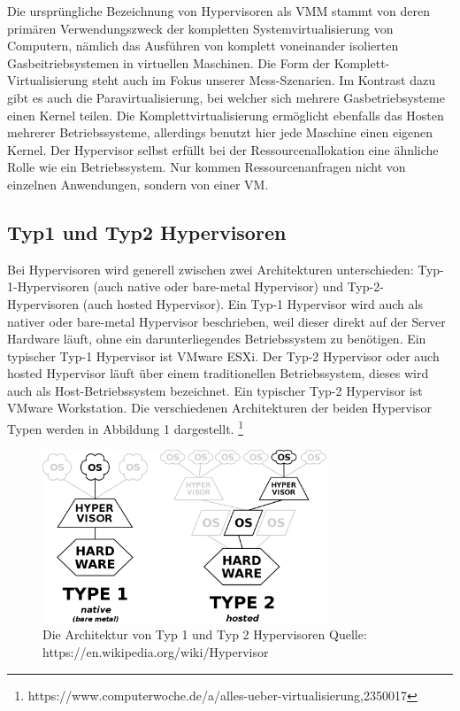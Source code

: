 \documentclass[conference]{IEEEtran}
\newcommand{\citep}{\cite}
\begin{document}
Die ursprüngliche Bezeichnung von Hypervisoren als VMM stammt von deren primären Verwendungszweck der kompletten Systemvirtualisierung von Computern, nämlich das Ausführen von komplett voneinander isolierten Gasbeitriebsystemen in virtuellen Maschinen. Die Form der Komplett-Virtualisierung steht auch im Fokus unserer Mess-Szenarien. Im Kontrast dazu gibt es auch die Paravirtualisierung, bei welcher sich mehrere Gasbetriebsysteme einen Kernel teilen. Die Komplettvirtualisierung ermöglicht ebenfalls das Hosten mehrerer Betriebssysteme, allerdings benutzt hier jede Maschine einen eigenen Kernel. Der Hypervisor selbst erfüllt bei der Ressourcenallokation eine ähnliche Rolle wie ein Betriebssystem. Nur kommen Ressourcenanfragen nicht von einzelnen Anwendungen, sondern von einer VM. \citep{Goldberg1973}

\subsection{Typ1 und Typ2 Hypervisoren}
Bei Hypervisoren wird generell zwischen zwei Architekturen unterschieden: Typ-1-Hypervisoren (auch native oder bare-metal Hypervisor) und Typ-2-Hypervisoren (auch hosted Hypervisor). Ein Typ-1 Hypervisor wird auch als nativer oder bare-metal Hypervisor beschrieben, weil dieser direkt auf der Server Hardware läuft, ohne ein darunterliegendes Betriebssystem zu benötigen. Ein typischer Typ-1 Hypervisor ist VMware ESXi. Der Typ-2 Hypervisor oder auch hosted Hypervisor läuft über einem traditionellen Betriebssystem, dieses wird auch als Host-Betriebssystem bezeichnet. Ein typischer Typ-2 Hypervisor ist VMware Workstation. Die verschiedenen Architekturen der beiden Hypervisor Typen werden in Abbildung 1 dargestellt. \footnote{https://www.computerwoche.de/a/alles-ueber-virtualisierung,2350017} \citep{Goldberg1973}

\begin{figure}[!h]
	\centering
	\includegraphics[keepaspectratio,width=8.5cm,height=0.75\textheight]{hypervisors.png}
	\caption{Die Architektur von Typ 1 und Typ 2 Hypervisoren \linebreak Quelle: https://en.wikipedia.org/wiki/Hypervisor}
	\label{architecture}
\end{figure}
\end{document}
